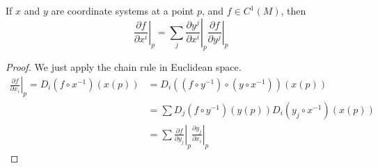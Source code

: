 \begin{theorem}
    If $x$ and $y$ are coordinate systems at a point $p$, and $f \in C^1(M)$, then
    \[ \left. \frac{\partial f}{\partial x^i} \right|_p = \sum_j \left. \frac{\partial y^j}{\partial x^i} \right|_p \left. \frac{\partial f}{\partial y^j} \right|_p \]
\end{theorem}
\begin{proof}
    We just apply the chain rule in Euclidean space.
    \begin{align*}
        \left.\frac{\partial f}{\partial x_i}\right|_p = D_i(f \circ x^{-1})(x(p)) &= D_i((f \circ y^{-1}) \circ (y \circ x^{-1}))(x(p))\\
        &= \sum D_j(f \circ y^{-1})(y(p)) D_i(y_j \circ x^{-1})(x(p))\\
        &= \sum \left.\frac{\partial f}{\partial y_j}\right|_p \left.\frac{\partial y_j}{\partial x_i}\right|_p
    \end{align*}
\end{proof}

